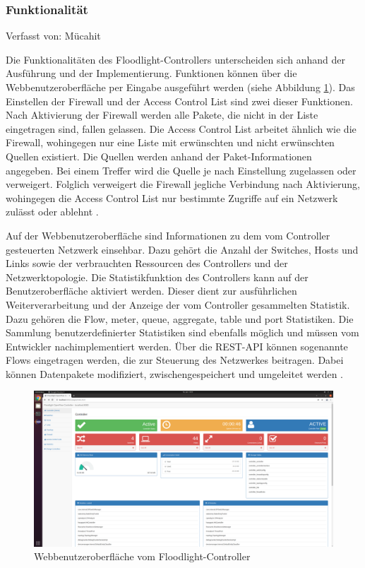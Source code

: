 \documentclass[fontsize=12pt,paper=a4,open=any,parskip=half,
  twoside=false,toc=listof,toc=bibliography,fleqn,leqno,
  captions=nooneline,captions=tableabove,british]{scrbook}
\begin{document}
\subsubsection{Funktionalität}
{\tiny Verfasst von: Mücahit\par}
Die Funktionalitäten des Floodlight-Controllers unterscheiden sich anhand der Ausführung und der Implementierung. Funktionen können über die Webbenutzeroberfläche per Eingabe ausgeführt werden (siehe Abbildung \ref{webui}). Das Einstellen der Firewall und der Access Control List sind zwei dieser Funktionen. Nach Aktivierung der Firewall werden alle Pakete, die nicht in der Liste eingetragen sind, fallen gelassen. Die Access Control List arbeitet ähnlich wie die Firewall, wohingegen nur eine Liste mit erwünschten und nicht erwünschten Quellen existiert. Die Quellen werden anhand der Paket-Informationen angegeben. Bei einem Treffer wird die Quelle je nach Einstellung zugelassen oder verweigert. Folglich verweigert die Firewall jegliche Verbindung nach Aktivierung, wohingegen die Access Control List nur bestimmte Zugriffe auf ein Netzwerk zulässt oder ablehnt \cite{firewall}. \par
Auf der Webbenutzeroberfläche sind Informationen zu dem vom Controller gesteuerten Netzwerk einsehbar. Dazu gehört die Anzahl der Switches, Hosts und Links sowie der verbrauchten Ressourcen des Controllers und der Netzwerktopologie. Die Statistikfunktion des Controllers kann auf der Benutzeroberfläche aktiviert werden. Dieser dient zur ausführlichen Weiterverarbeitung und der Anzeige der vom Controller gesammelten Statistik. Dazu gehören die Flow, meter, queue, aggregate, table und port Statistiken. Die Sammlung benutzerdefinierter Statistiken sind ebenfalls möglich und müssen vom Entwickler nachimplementiert werden. Über die REST-API können sogenannte Flows eingetragen werden, die zur Steuerung des Netzwerkes beitragen. Dabei können Datenpakete modifiziert, zwischengespeichert und umgeleitet werden \cite{statistik}.

\begin{figure}[H]
 \centering
 \includegraphics[width=1.0\textwidth]{Bilder/webui}
 \captionsetup{justification=centering}
 \caption{Webbenutzeroberfläche vom Floodlight-Controller}
 \label{webui}
\end{figure}
\end{document}
